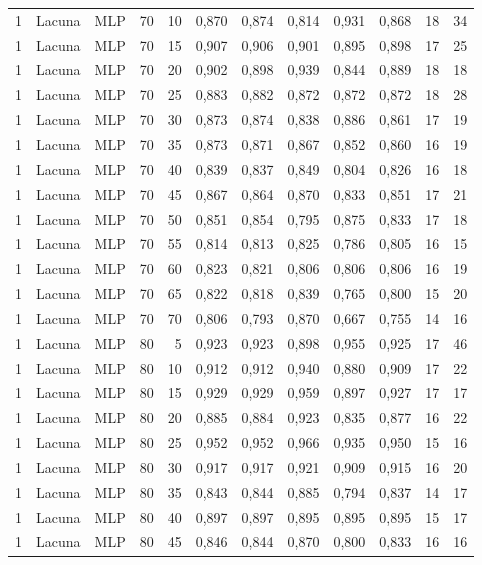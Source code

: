 \begin{longtable}{@{}rllrrrrrrrrr@{}}
1 & Lacuna & MLP & 70 & 10 & 0,870 & 0,874 & 0,814 & 0,931 & 0,868 & 18 & 34 \\
1 & Lacuna & MLP & 70 & 15 & 0,907 & 0,906 & 0,901 & 0,895 & 0,898 & 17 & 25 \\
1 & Lacuna & MLP & 70 & 20 & 0,902 & 0,898 & 0,939 & 0,844 & 0,889 & 18 & 18 \\
1 & Lacuna & MLP & 70 & 25 & 0,883 & 0,882 & 0,872 & 0,872 & 0,872 & 18 & 28 \\
1 & Lacuna & MLP & 70 & 30 & 0,873 & 0,874 & 0,838 & 0,886 & 0,861 & 17 & 19 \\
1 & Lacuna & MLP & 70 & 35 & 0,873 & 0,871 & 0,867 & 0,852 & 0,860 & 16 & 19 \\
1 & Lacuna & MLP & 70 & 40 & 0,839 & 0,837 & 0,849 & 0,804 & 0,826 & 16 & 18 \\
1 & Lacuna & MLP & 70 & 45 & 0,867 & 0,864 & 0,870 & 0,833 & 0,851 & 17 & 21 \\
1 & Lacuna & MLP & 70 & 50 & 0,851 & 0,854 & 0,795 & 0,875 & 0,833 & 17 & 18 \\
1 & Lacuna & MLP & 70 & 55 & 0,814 & 0,813 & 0,825 & 0,786 & 0,805 & 16 & 15 \\
1 & Lacuna & MLP & 70 & 60 & 0,823 & 0,821 & 0,806 & 0,806 & 0,806 & 16 & 19 \\
1 & Lacuna & MLP & 70 & 65 & 0,822 & 0,818 & 0,839 & 0,765 & 0,800 & 15 & 20 \\
1 & Lacuna & MLP & 70 & 70 & 0,806 & 0,793 & 0,870 & 0,667 & 0,755 & 14 & 16 \\
1 & Lacuna & MLP & 80 & 5 & 0,923 & 0,923 & 0,898 & 0,955 & 0,925 & 17 & 46 \\
1 & Lacuna & MLP & 80 & 10 & 0,912 & 0,912 & 0,940 & 0,880 & 0,909 & 17 & 22 \\
1 & Lacuna & MLP & 80 & 15 & 0,929 & 0,929 & 0,959 & 0,897 & 0,927 & 17 & 17 \\
1 & Lacuna & MLP & 80 & 20 & 0,885 & 0,884 & 0,923 & 0,835 & 0,877 & 16 & 22 \\
1 & Lacuna & MLP & 80 & 25 & 0,952 & 0,952 & 0,966 & 0,935 & 0,950 & 15 & 16 \\
1 & Lacuna & MLP & 80 & 30 & 0,917 & 0,917 & 0,921 & 0,909 & 0,915 & 16 & 20 \\
1 & Lacuna & MLP & 80 & 35 & 0,843 & 0,844 & 0,885 & 0,794 & 0,837 & 14 & 17 \\
1 & Lacuna & MLP & 80 & 40 & 0,897 & 0,897 & 0,895 & 0,895 & 0,895 & 15 & 17 \\
1 & Lacuna & MLP & 80 & 45 & 0,846 & 0,844 & 0,870 & 0,800 & 0,833 & 16 & 16 \\

\end{longtable}
